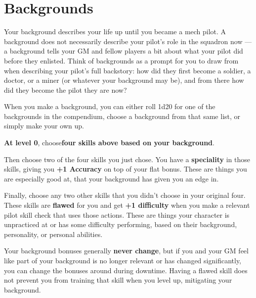 \section{Backgrounds}

Your background describes your life up until you became a mech pilot. A background does not
necessarily describe your pilot’s role in the squadron now — a background tells your GM and
fellow players a bit about what your pilot did before they enlisted. Think of backgrounds as a
prompt for you to draw from when describing your pilot’s full backstory: how did they first
become a soldier, a doctor, or a miner (or whatever your background may be), and from there
how did they become the pilot they are now?

When you make a background, you can either roll 1d20 for one of the backgrounds in the
compendium, choose a background from that same list, or simply make your own up.

\textbf{At level 0}, choose\textbf{four skills above based on your background}. 

Then choose two of the four skills you just chose. You have a \textbf{speciality} in those skills, giving
you \textbf{+1 Accuracy} on top of your flat bonus. These are things you are especially good at, that
your background has given you an edge in.

Finally, choose any two other skills that you didn’t choose in your original four. These skills are
\textbf{flawed} for you and get \textbf{+1 difficulty} when you make a relevant pilot skill check that uses those
actions. These are things your character is unpracticed at or has some difficulty performing,
based on their background, personality, or personal abilities.

Your background bonuses generally \textbf{never change}, but if you and your GM feel like part of your
background is no longer relevant or has changed significantly, you can change the bonuses
around during downtime. Having a flawed skill does not prevent you from training that skill when
you level up, mitigating your background.